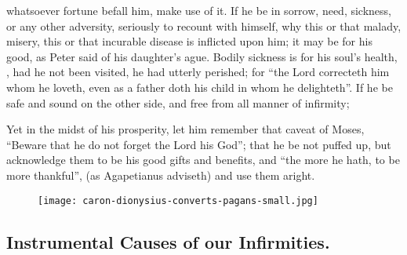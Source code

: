 whatsoever fortune befall him, make use of it. If he be in sorrow, need,
sickness, or any other adversity, seriously to recount with himself, why this
or that malady, misery, this or that incurable disease is inflicted upon him;
it may be for his good,  as Peter said of
his daughter's ague. Bodily sickness is for his soul's health, , had he not been visited, he had utterly perished; for
\enquote{the Lord correcteth him whom he loveth, even as a father
doth his child in whom he delighteth}. If he be safe and sound on the other
side, and free from all manner of infirmity; 


Yet in the midst of his prosperity, let him remember that caveat of Moses,
\enquote{Beware that he do not forget the Lord his God}; that he be
not puffed up, but acknowledge them to be his good gifts and benefits, and
\enquote{the more he hath, to be more thankful}, (as Agapetianus
adviseth) and use them aright.

\cleartoleftpage{}
\begin{figure}[p]
  \begingroup
  \centering
  \texttt{[image: caron-dionysius-converts-pagans-small.jpg]}
  \label{fig:dionysiusconvertspagans}
\end{figure}
\restoregeometry

\clearpage{}
\subsection{Instrumental Causes of our Infirmities.}


